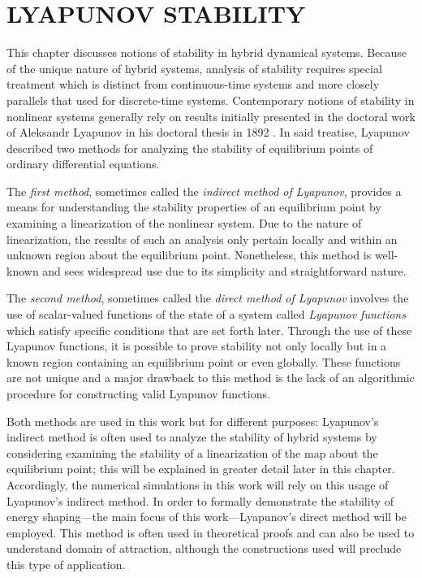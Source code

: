 \chapter{\uppercase{Lyapunov Stability}}

This chapter discusses notions of stability in hybrid dynamical systems.
%
Because of the unique nature of hybrid systems, analysis of stability requires
special treatment which is distinct from continuous-time systems and more
closely parallels that used for discrete-time systems.
%
Contemporary notions of stability in nonlinear systems generally rely on results
initially presented in the doctoral work of Aleksandr Lyapunov in his doctoral
thesis in 1892 \cite{Lyapunov1992}.
%
In said treatise, Lyapunov described two methods for analyzing the stability of
equilibrium points of ordinary differential equations.

The {\em first method}, sometimes called the {\em indirect method of Lyapunov},
provides a means for understanding the stability properties of an equilibrium
point by examining a linearization of the nonlinear system.
%
Due to the nature of linearization, the results of such an analysis only pertain
locally and within an unknown region about the equilibrium point.
%
Nonetheless, this method is well-known and sees widespread use due to its
simplicity and straightforward nature.
%

The {\em second method}, sometimes called the {\em direct method of Lyapunov}
involves the use of scalar-valued functions of the state of a system called {\em
  Lyapunov functions} which satisfy specific conditions that are set forth
later.
%
Through the use of these Lyapunov functions, it is possible to prove
stability not only locally but in a known region containing an equilibrium point
or even globally.
%
These functions are not unique and a major drawback to this method is the lack
of an algorithmic procedure for constructing valid Lyapunov functions.

Both methods are used in this work but for different purposes:
%
Lyapunov's indirect method is often used to analyze the stability of hybrid
systems by considering examining the stability of a linearization of the
\Poincare{} map about the equilibrium point; this will be explained in greater
detail later in this chapter.
%
Accordingly, the numerical simulations in this work will rely on this usage of
Lyapunov's indirect method.
%
In order to formally demonstrate the stability of energy shaping---the main
focus of this work---Lyapunov's direct method will be employed.
%
This method is often used in theoretical proofs and can also be used to
understand domain of attraction, although the constructions used will preclude
this type of application.

